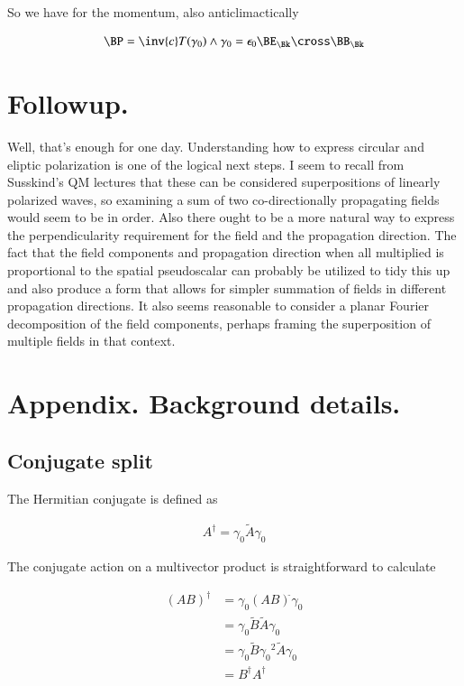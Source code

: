 So we have for the momentum, also anticlimactically

\begin{align}
\BP = \inv{c} T(\gamma_0) \wedge \gamma_0 = \epsilon_0 \BE_\Bk \cross \BB_\Bk 
\end{align}

\section{Followup.}

Well, that's enough for one day.  Understanding how to express circular and eliptic polarization is one of the logical next steps.  I seem to recall from Susskind's QM lectures that these can be considered superpositions of linearly polarized waves, so examining a sum of two co-directionally propagating fields would seem to be in order.  Also there ought to be a more natural way to express the perpendicularity requirement for the field and the propagation direction.  The fact that the field components and propagation direction when all multiplied is proportional to the spatial pseudoscalar can probably be utilized to tidy this up and also produce a form that allows for simpler summation of fields in different propagation directions.  It also seems reasonable to consider a planar Fourier decomposition of the field components, perhaps framing the superposition of multiple fields in that context.

\section{Appendix.  Background details.}

\subsection{Conjugate split}

The Hermitian conjugate is defined as

\begin{align}
A^\dagger = \gamma_0 \tilde{A} \gamma_0
\end{align}

The conjugate action on a multivector product is straightforward to calculate

\begin{align*}
(A B)^\dagger
&= \gamma_0 (A B)^{\tilde{}} \gamma_0 \\
&= \gamma_0 \tilde{B} \tilde{A} \gamma_0 \\
&= \gamma_0 \tilde{B} {\gamma_0}^2 \tilde{A} \gamma_0 \\
&= B^\dagger A^\dagger
\end{align*}

